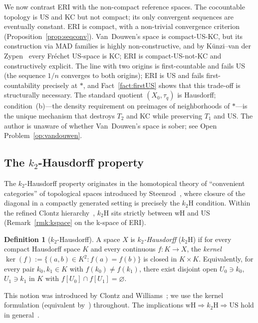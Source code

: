 \documentclass[11pt]{article}
\theoremstyle{definition}
\newtheorem{definition}[theorem]{Definition}
\theoremstyle{remark}
\begin{document}
We now contrast ERI with the non-compact reference spaces.
The cocountable topology is US and KC but not compact; its only
convergent sequences are eventually constant.
ERI is compact, with a non-trivial convergence criterion
(Proposition~\ref{prop:seqconv}).
Van~Douwen's space is compact-US-KC, but its construction via MAD
families is highly non-constructive, and by K\"{u}nzi--van der
Zypen~\cite{bib:kunzi} every Fr\'{e}chet US-space is KC; ERI is
compact-US-not-KC and constructively explicit.
The line with two origins is first-countable and fails US (the sequence
$1/n$ converges to both origins); ERI is US and fails first-countability
precisely at $\ast$, and Fact~\ref{fact:firstUS} shows that
this trade-off is structurally necessary.
The standard quotient $(X_0, \tau_q)$ is Hausdorff; condition~(b)---the
density requirement on preimages of neighborhoods of $\ast$---is the
unique mechanism that destroys $T_2$ and KC while preserving $T_1$
and US.
The author is unaware of whether Van~Douwen's space is sober; see
Open Problem~\ref{op:vandouwen}.

\subsection{The $k_2$-Hausdorff property}\label{subsec:k2Hproof}

The $k_2$-Hausdorff property originates in the homotopical theory of
``convenient categories'' of topological spaces introduced by
Steenrod~\cite{bib:steenrod}, where closure of the diagonal in a
compactly generated setting is precisely the $k_2$H condition.
Within the refined Clontz hierarchy~\cite{bib:clontz,bib:clontzwilliams},
$k_2$H sits strictly between wH and US
(Remark~\ref{rmk:kspace} on the k-space of ERI).

\begin{definition}[$k_2$-Hausdorff]\label{def:k2H}
A space $X$ is \emph{$k_2$-Hausdorff} ($k_2$H) if for every compact
Hausdorff space $K$ and every continuous $f\colon K \to X$, the
\emph{kernel} $\ker(f) := \{(a,b) \in K^2 : f(a) = f(b)\}$ is closed
in $K \times K$.
Equivalently, for every pair
$k_0, k_1 \in K$ with $f(k_0) \neq f(k_1)$, there exist disjoint open
$U_0 \ni k_0$, $U_1 \ni k_1$ in $K$ with
$f[U_0] \cap f[U_1] = \varnothing$.
\end{definition}

This notion was introduced by
Clontz and Williams~\cite{bib:clontzwilliams}; we use the kernel
formulation (equivalent by~\cite[Prop.~2.3]{bib:clontzwilliams})
throughout.
The implications
$\mathrm{wH} \Rightarrow k_2\mathrm{H} \Rightarrow \mathrm{US}$
hold in general~\cite{bib:clontz}.
\end{document}
